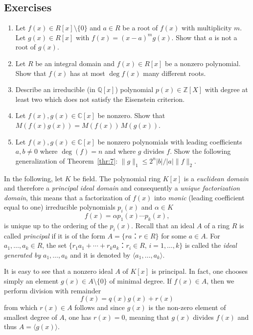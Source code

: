 \subsection*{Exercises}
\begin{enumerate}
\item Let $f(x) ∈ R[x]\setminus\{0\}$ and $a ∈R$ be a root of $f(x)$ with multiplicity $m$. Let $g(x) ∈ R[x] $ with $f(x) = (x-a)^m g(x)$. Show that $a$ is not a root of $g(x)$.
\item Let $R$ be an integral domain and  $f(x) ∈ R[x]$ be a nonzero polynomial. Show that $f(x)$ has at most $\deg f(x)$ many different roots.
\item Describe an irreducible (in $ℚ[x]$) polynomial $p(x) ∈ℤ[X]$ with degree at least two which does not satisfy the Eisenstein criterion.
\item Let  $f(x),g(x) ∈ℂ[x]$ be nonzero. Show that $M(f(x)g(x)) = M(f(x)) \, M (g(x))$.
\item Let $f(x),g(x) ∈ℂ[x]$ be nonzero polynomials with leading coefficients $a,b ≠0$ where $\deg (f) = n$ and where $g$ divides $f$. Show the following generalization of Theorem~\ref{thr:7}: $\|g\|_1 ≤ 2^n |b| / |a| \|f\|_2$. 
\end{enumerate}



In the following, let $K$ be field. The polynomial ring $K[x]$ is a \emph{euclidean domain} and therefore a \emph{principal ideal domain} and consequently a \emph{unique factorization domain}, this means that a factorization of $f(x)$ into \emph{monic} (leading coefficient equal to one) irreducible polynomials $p_i(x)$  and $α ∈K$ 
\begin{equation}
  \label{eq:3}
  f(x) = α p_1(x) \cdots p_k(x), 
\end{equation}
is unique up to the ordering of the $p_i(x)$. Recall that an ideal $A$ of a ring  $R$  is called \emph{principal} if it is of the form $A = \{ r a ： r ∈R\}$ for some $a ∈A$. For $a_1,\dots,a_k ∈R$, the set  $\{ r_1 a_1+ \cdots + r_k a_k ： r_i ∈R, \, i=1,\dots,k\}$ is called the \emph{ideal generated by} $a_1,\dots,a_k$ and it is  denoted by $〈a_1,\dots,a_k〉$. 

It is easy to see that a nonzero ideal $A$ of $K[x]$ is principal. In fact, one chooses simply an element $g(x) ∈A \setminus \{0\}$ of minimal degree. If $f(x) ∈A$, then we perform division with remainder
\begin{displaymath}
  f(x)  = q(x) g(x) + r(x) 
\end{displaymath}
from which $r(x) ∈A$ follows and since $g(x)$ is the non-zero  element of smallest degree of $A$, one has $r(x) = 0$, meaning that $g(x)$ divides $f(x)$ and thus $A = 〈g(x)〉$.

